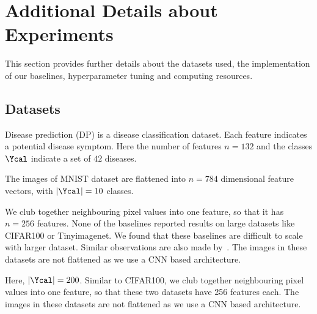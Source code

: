 \documentclass[letterpaper]{article}
\begin{document}
\section{Additional Details about Experiments}
\label{app:setup}
This section provides further details about the datasets used, the implementation of our baselines, hyperparameter tuning and computing resources.

\subsection{Datasets}
\begin{table}[!htb]
    \centering
\caption{Dataset statistics}
\label{table:dataset}
\end{table}
 Disease prediction (DP) is a disease classification
dataset. Each feature indicates a potential disease symptom. Here the number of features $n=132$ and the classes $\Ycal$ indicate a set of $42$ diseases.

The images of MNIST dataset are flattened into $n=784$ dimensional feature vectors, with $|\Ycal|=10$ classes.

 We club together neighbouring pixel values into one feature, so that it has $n=256$ features. None of the baselines reported results on large datasets like CIFAR100 or Tinyimagenet. We found that these baselines are difficult to scale with larger dataset. Similar observations are also made by~\citet{gsm}.  The images in these datasets are not flattened as we use a CNN based architecture.

 Here, $|\Ycal|= 200$. Similar to CIFAR100, we club together neighbouring pixel values into one feature, so that these two datasets have 256 features each. The images in these datasets are not flattened as we use a CNN based architecture.
\end{document}
